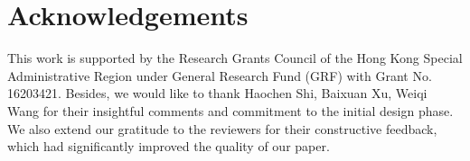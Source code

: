 \section{Acknowledgements}

This work is supported by the Research Grants Council of the Hong Kong Special Administrative Region under General Research Fund (GRF) with Grant No. 16203421. Besides, we would like to thank Haochen Shi, Baixuan Xu, Weiqi Wang for their insightful comments and commitment to the initial design phase. We also extend our gratitude to the reviewers for their constructive feedback, which had significantly improved the quality of our paper.